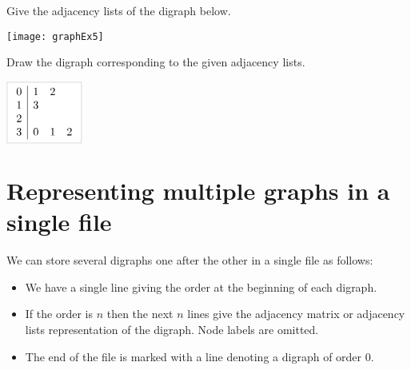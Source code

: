 \begin{Boxample}[1] \label{ex:drawadjlist}
Give the adjacency lists of the digraph below.

	\vspace{1cm}
	\texttt{[image: graphEx5]}
	\vspace{1cm}
	
Draw the digraph corresponding to the given adjacency lists.

	\vspace{1cm}
	$\lightgraybox{\begin{array}{c|ccc}
	0 & 1 & 2  \\
	1 & 3  \\
	2  \\
	3 & 0 & 1 & 2 \\
	\end{array}}$
\end{Boxample}

\section{Representing multiple graphs in a single file}
We can store several digraphs one after the other in a single file as follows: 
\begin{itemize}
  \item We have a single line giving the order at the beginning of each digraph.
  \item If the order is $n$ then the next $n$ lines give the adjacency matrix 
  or adjacency lists representation of the digraph. Node labels are omitted.
  \item The end of the file is marked with a line denoting a digraph of order $0$.
\end{itemize}


